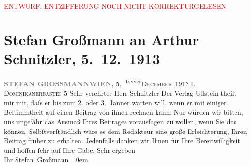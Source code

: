 
\begin{center}
            \textcolor{red}{ENTWURF. ENTZIFFERUNG NOCH NICHT KORREKTURGELESEN}
                      \end{center}
            
               \section[Stefan Großmann an Arthur Schnitzler, 5. 12. 1913]{ Stefan Großmann an Arthur Schnitzler, 5. 12. 1913}\nopagebreak{}\rehead{ }\begin{ledgroupsized}[t]{13cm}\normalsize\beginnumbering{} \toendnotes[C]{\smallbreak\pagebreak[2]} 
\pstart
           \noindent{}{\pb}\textcolor{gray}{\textbf{STEFAN GROSSMANN}}\hfill \textcolor{gray}{\textbf{WIEN,}}{ }5. \substVorne{}\textsuperscript{\textsc{Janner}}{\allowbreak}\substDazwischen{}\textsc{December}\substHinten{} 1913\pend
           \pstart
           \raggedleft{}I. \textsc{Dominikanerbastei} 5\pend
           \pstart\center{}Sehr verehrter Herr Schnitzler\pend\pstart
           Der Verlag Ullstein theilt mir mit, daſs er bis
                    zum 2. oder 3. Jänner warten will, wenn er mit
                    einiger Beſtimmtheit auf einen Beitrag von ihnen rechnen kann. Nur würden wir
                    bitten, uns ungefähr das Ausmaß Ihres Beitrages vorausſagen zu wollen, wenn Sie
                    das können.\pend
           \pstart
           Selbſtverſtändlich wäre es dem Redakteur eine große Erleichterung, Ihren Beitrag
                    früher zu erhalten.\pend
           \pstart
           Jedenfalls danken wir Ihnen für Ihre Bereitwilligkeit und hoffen ſehr auf Ihre
                    Gabe.\pend
           \pstart
           Sehr ergeben{\\[\baselineskip]} Ihr \spacefill\mbox{Stefan Großmann}\pend
           \leftskip=0em{}\endnumbering{}\end{ledgroupsized}  \newcommand{\dateiname}{L02160}\newcommand{\titel}{Stefan Großmann an Arthur Schnitzler, 5. 12. 1913}\newcommand{\editorInnen}{Martin Anton Müller und Gerd-Hermann Susen}
      